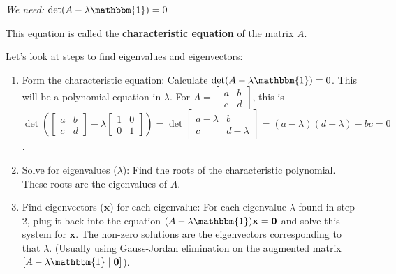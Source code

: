 \documentclass[11pt]{article}
\newcommand{\x}{\mathbf{x}}
\newcommand{\id}{\mathbbm{1}}
\begin{document}
\begin{center}
\textit{We need: } $\det(A - \lambda \id) = 0$
\end{center}

This equation is called the \textbf{characteristic equation} of the matrix $A$.

Let's look at steps to find eigenvalues and eigenvectors:
\begin{enumerate}
    \item Form the characteristic equation: Calculate $\det(A - \lambda \id) = 0$. This will be a polynomial equation in $\lambda$.
    For $A = \begin{bmatrix} a & b \\ c & d \end{bmatrix}$, this is $\det \left( \begin{bmatrix} a & b \\ c & d \end{bmatrix} - \lambda \begin{bmatrix} 1 & 0 \\ 0 & 1 \end{bmatrix} \right) = \det \begin{bmatrix} a-\lambda & b \\ c & d-\lambda \end{bmatrix} = (a-\lambda)(d-\lambda) - bc = 0$.
    \item Solve for eigenvalues ($\lambda$): Find the roots of the characteristic polynomial. These roots are the eigenvalues of $A$.
    \item Find eigenvectors ($\x$) for each eigenvalue: For each eigenvalue $\lambda$ found in step 2, plug it back into the equation $(A - \lambda \id) \x = \mathbf{0}$ and solve this system for $\x$. The non-zero solutions are the eigenvectors corresponding to that $\lambda$. (Usually using Gauss-Jordan elimination on the augmented matrix $[A-\lambda \id \mid \mathbf{0}]$).
\end{enumerate}
\end{document}
